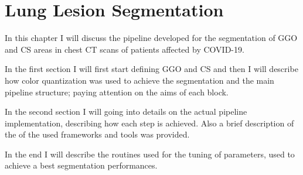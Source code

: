 \documentclass{standalone}
\begin{document}
	\chapter{Lung Lesion Segmentation}
	
	In this chapter I will discuss the pipeline developed for the segmentation of GGO and CS areas in chest CT scans of patients affected by COVID-19.
	
	In the first section I will first start defining GGO and CS and then I will describe how color quantization was used to achieve the segmentation and the main pipeline structure; paying attention on the aims of each block.
	
	In the second section I will going into details on the actual pipeline implementation, describing how each step is achieved. Also a brief description of the of the used frameworks and tools was provided.
	
	In the end I will describe the routines used for the tuning of parameters, used to achieve a best segmentation performances.
	
\end{document}
